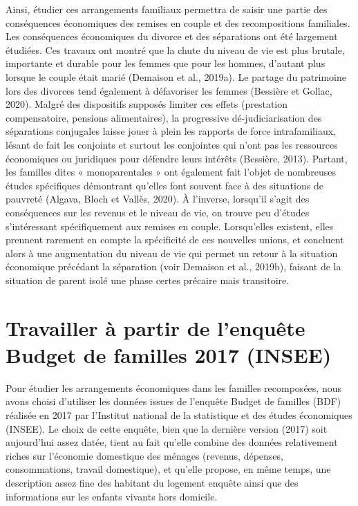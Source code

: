 \documentclass[
  12pt,
]{book}
\begin{document}
Ainsi, étudier ces arrangements familiaux permettra de saisir une partie
des conséquences économiques des remises en couple et des recompositions
familiales. Les conséquences économiques du divorce et des séparations
ont été largement étudiées. Ces travaux ont montré que la chute du
niveau de vie est plus brutale, importante et durable pour les femmes
que pour les hommes, d'autant plus lorsque le couple était marié
(Demaison et al., 2019a). Le partage du patrimoine lors des divorces
tend également à défavoriser les femmes (Bessière et Gollac, 2020).
Malgré des dispositifs supposés limiter ces effets (prestation
compensatoire, pensions alimentaires), la progressive dé-judiciarisation
des séparations conjugales laisse jouer à plein les rapports de force
intrafamiliaux, lésant de fait les conjoints et surtout les conjointes
qui n'ont pas les ressources économiques ou juridiques pour défendre
leurs intérêts (Bessière, 2013). Partant, les familles dites «
monoparentales » ont également fait l'objet de nombreuses études
spécifiques démontrant qu'elles font souvent face à des situations de
pauvreté (Algava, Bloch et Vallès, 2020). À l'inverse, lorsqu'il s'agit
des conséquences sur les revenus et le niveau de vie, on trouve peu
d'études s'intéressant spécifiquement aux remises en couple.
Lorsqu'elles existent, elles prennent rarement en compte la spécificité
de ces nouvelles unions, et concluent alors à une augmentation du niveau
de vie qui permet un retour à la situation économique précédant la
séparation (voir Demaison et al., 2019b), faisant de la situation de
parent isolé une phase certes précaire mais transitoire.

\section{Travailler à partir de l'enquête Budget de familles 2017
(INSEE)}\label{travailler-uxe0-partir-de-lenquuxeate-budget-de-familles-2017-insee}

Pour étudier les arrangements économiques dans les familles recomposées,
nous avons choisi d'utiliser les données issues de l'enquête Budget de
familles (BDF) réalisée en 2017 par l'Institut national de la
statistique et des études économiques (INSEE). Le choix de cette
enquête, bien que la dernière version (2017) soit aujourd'hui assez
datée, tient au fait qu'elle combine des données relativement riches sur
l'économie domestique des ménages (revenus, dépenses, consommations,
travail domestique), et qu'elle propose, en même temps, une description
assez fine des habitant du logement enquête ainsi que des informations
sur les enfants vivants hors domicile.
\end{document}
